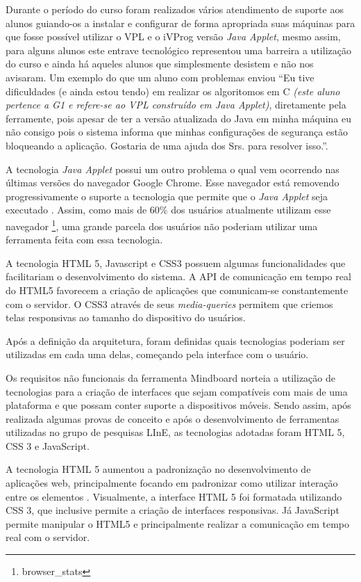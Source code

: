 Durante o período do curso foram realizados vários atendimento de suporte aos alunos guiando-os a instalar e configurar de forma apropriada suas máquinas para que fosse possível utilizar o VPL e o iVProg versão \emph{Java Applet}, mesmo assim, para alguns alunos este entrave tecnológico representou uma barreira a utilização do curso e ainda há aqueles alunos que simplesmente desistem e não nos avisaram. Um exemplo do que um aluno com problemas enviou ``Eu tive dificuldades (e ainda estou tendo) em realizar os algoritomos em C \emph{(este aluno pertence a G1 e refere-se ao VPL construído em Java Applet)}, diretamente pela ferramente, pois apesar de ter a versão atualizada do Java em minha máquina eu não consigo pois o sistema informa que minhas configurações de segurança estão bloqueando a aplicação. Gostaria de uma ajuda dos Srs. para resolver isso.''. 

A tecnologia \emph{Java Applet} possui um outro problema o qual vem ocorrendo nas últimas versões do navegador Google Chrome. Esse navegador está removendo progressivamente o suporte a tecnologia que permite que o \emph{Java Applet} seja executado \cite{java_chrome}. Assim, como mais de 60\% dos usuários atualmente utilizam esse navegador \footnote{browser_stats}, uma grande parcela dos usuários não poderiam utilizar uma ferramenta feita com essa tecnologia.

A tecnologia HTML 5, Javascript e CSS3 possuem algumas funcionalidades que facilitariam o desenvolvimento do sistema. A API de comunicação em tempo real do HTML5 favorecem a criação de aplicações que comunicam-se constantemente com o servidor. O CSS3 através de seus \emph{media-queries} permitem que criemos telas responsivas ao tamanho do dispositivo do usuários.

Após a definição da arquitetura, foram definidas quais tecnologias poderiam ser utilizadas em cada uma delas, começando pela interface com o usuário. 


Os requisitos não funcionais da ferramenta Mindboard norteia a utilização de tecnologias para a criação de interfaces que sejam compatíveis com mais de uma plataforma e que possam conter suporte a dispositivos móveis. Sendo assim, após realizada algumas provas de conceito e após o desenvolvimento de ferramentas utilizadas no grupo de pesquisas LInE, as tecnologias adotadas foram HTML 5, CSS 3 e JavaScript.

A tecnologia HTML 5 aumentou a padronização no desenvolvimento de aplicações web, principalmente focando em padronizar como utilizar interação entre os elementos \cite{html5}. Visualmente, a interface HTML 5 foi formatada utilizando CSS 3, que inclusive permite a criação de interfaces responsivas. Já JavaScript permite manipular o HTML5 e principalmente realizar a comunicação em tempo real com o servidor.

